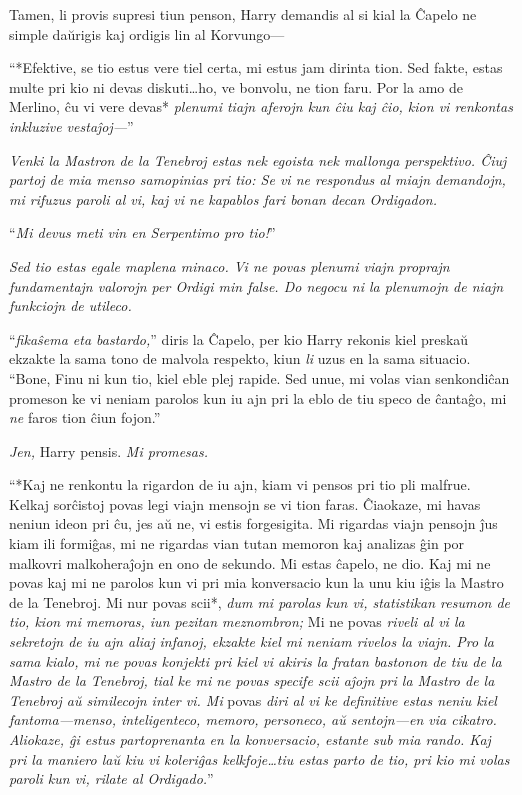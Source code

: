 Tamen, li provis supresi tiun penson, Harry demandis al si kial la
Ĉapelo ne simple daŭrigis kaj ordigis lin al Korvungo—

``*Efektive, se tio estus vere tiel certa, mi estus jam dirinta
tion. Sed fakte, estas multe pri kio ni devas diskuti\ldots ho, ve
bonvolu, ne tion faru. Por la amo de Merlino, ĉu vi vere devas*
\emph{plenumi tiajn aferojn kun ĉiu kaj ĉio, kion vi renkontas
  inkluzive vestaĵoj—}''
 
\emph{Venki la Mastron de la Tenebroj estas nek egoista nek mallonga
  perspektivo. Ĉiuj partoj de mia menso samopinias pri tio: Se vi ne
  respondus al miajn demandojn, mi rifuzus paroli al vi, kaj vi ne
  kapablos fari bonan decan Ordigadon.}

``\emph{Mi devus meti vin en Serpentimo pro tio!}''

\emph{Sed tio estas egale maplena minaco. Vi ne povas plenumi viajn
  proprajn fundamentajn valorojn per Ordigi min false. Do negocu ni la
  plenumojn de niajn funkciojn de utileco.}

``\emph{fikaŝema eta bastardo,}'' diris la Ĉapelo, per kio Harry
rekonis kiel preskaŭ ekzakte la sama tono de malvola respekto, kiun
\emph{li} uzus en la sama situacio. ``Bone, Finu ni kun tio, kiel eble
plej rapide. Sed unue, mi volas vian senkondiĉan promeson ke vi neniam
parolos kun iu ajn pri la eblo de tiu speco de ĉantaĝo, mi \emph{ne}
faros tion ĉiun fojon.''

\emph{Jen,} Harry pensis. \emph{Mi promesas.}

``*Kaj ne renkontu la rigardon de iu ajn, kiam vi pensos pri tio pli
malfrue. Kelkaj sorĉistoj povas legi viajn mensojn se vi tion
faras. Ĉiaokaze, mi havas neniun ideon pri ĉu, jes aŭ ne, vi estis
forgesigita. Mi rigardas viajn pensojn ĵus kiam ili formiĝas, mi ne
rigardas vian tutan memoron kaj analizas ĝin por malkovri
malkoheraĵojn en ono de sekundo. Mi estas ĉapelo, ne dio. Kaj mi ne
povas kaj mi ne parolos kun vi pri mia konversacio kun la unu kiu iĝis
la Mastro de la Tenebroj. Mi nur povas scii*, \emph{dum mi parolas kun
  vi, statistikan resumon de tio, kion mi memoras, iun pezitan
  meznombron;} Mi ne povas \emph{riveli al vi la sekretojn de iu ajn
  aliaj infanoj, ekzakte kiel mi neniam rivelos la viajn. Pro la sama
  kialo, mi ne povas konjekti pri kiel vi akiris la fratan bastonon de
  tiu de la Mastro de la Tenebroj, tial ke mi ne povas specife scii
  aĵojn pri la Mastro de la Tenebroj aŭ similecojn inter vi. Mi} povas
\emph{diri al vi ke definitive estas neniu kiel fantoma—menso,
  inteligenteco, memoro, personeco, aŭ sentojn—en via
  cikatro. Aliokaze, ĝi estus partoprenanta en la konversacio, estante
  sub mia rando. Kaj pri la maniero laŭ kiu vi koleriĝas
  kelkfoje\ldots tiu estas parto de tio, pri kio mi volas paroli kun
  vi, rilate al Ordigado.}''

